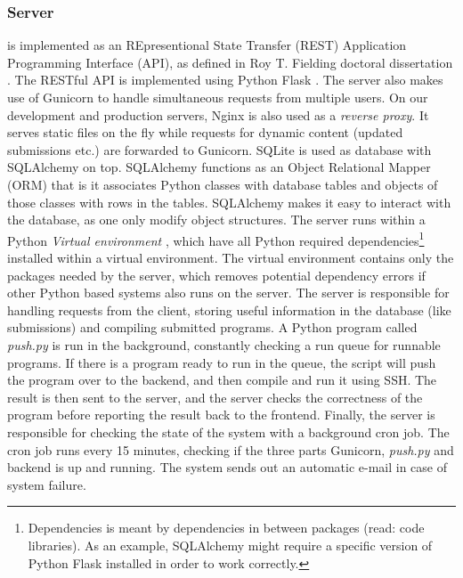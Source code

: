 \subsubsection{Server} is implemented as an REpresentional State Transfer (REST) Application Programming Interface (API), as defined in Roy T. Fielding doctoral dissertation \cite{phd:rtf}. The RESTful API is implemented using Python Flask \cite{m:flask}. The server also makes use of Gunicorn \cite{m:guni} to handle simultaneous requests from multiple users. On our development and production servers, Nginx \cite{m:nginx} is also used as a \textit{reverse proxy}. It serves static files on the fly while requests for dynamic content (updated submissions etc.) are forwarded to Gunicorn. SQLite \cite{m:sqlite} is used as database with SQLAlchemy\cite{m:sqlalc} on top. SQLAlchemy functions as an Object Relational Mapper (ORM) that is it associates Python classes with database tables and objects of those classes with rows in the tables. SQLAlchemy makes it easy to interact with the database, as one only modify object structures. The server runs within a Python \textit{Virtual environment} \cite{m:virtualenv}, which have all Python required dependencies\footnote{Dependencies is meant by dependencies in between packages (read: code libraries). As an example, SQLAlchemy might require a specific version of Python Flask installed in order to work correctly.} installed within a virtual environment. The virtual environment contains only the packages needed by the server, which removes potential dependency errors if other Python based systems also runs on the server. The server is responsible for handling requests from the client, storing useful information in the database (like submissions) and compiling submitted programs. A Python program called \textit{push.py} is run in the background, constantly checking a run queue for runnable programs. If there is a program ready to run in the queue, the script will push the program over to the backend, and then compile and run it using SSH. The result is then sent to the server, and the server checks the correctness of the program before reporting the result back to the frontend. Finally, the server is responsible for checking the state of the system with a background cron job. The cron job runs every 15 minutes, checking if the three parts Gunicorn, \textit{push.py} and backend is up and running. The system sends out an automatic e-mail in case of system failure.

